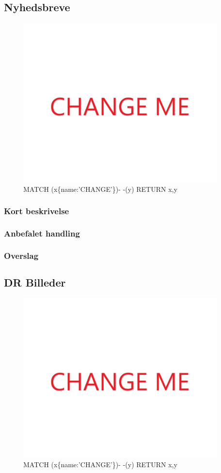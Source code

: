 \documentclass{article}
\begin{document}
\subsection{Nyhedsbreve}
\begin{figure}[h]
\includegraphics[width=300pt]{CHANGE.PNG}
\caption{MATCH (x\{name:'CHANGE'\})- -(y) RETURN x,y}
\end{figure}
\subsubsection{Kort beskrivelse}
\subsubsection{Anbefalet handling}
\subsubsection{Overslag}
\newpage{}
\clearpage


\subsection{DR Billeder}
\begin{figure}[h]
\includegraphics[width=300pt]{CHANGE.PNG}
\caption{MATCH (x\{name:'CHANGE'\})- -(y) RETURN x,y}
\end{figure}
\end{document}
